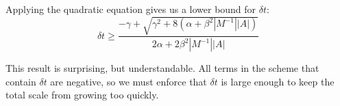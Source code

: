 Applying the quadratic equation gives us a lower bound for $\delta t$:
\begin{equation}
\delta t \ge \frac{-\gamma + \sqrt{\gamma^2 + 8(\alpha + \beta^2|M^{-1}| |A|)}}{2\alpha + 2\beta^2|M^{-1}| |A|}
\end{equation}

This result is surprising, but understandable. All terms in the scheme that contain $\delta t$ are negative, so we must
enforce that $\delta t$ is large enough to keep the total scale from growing too quickly.

